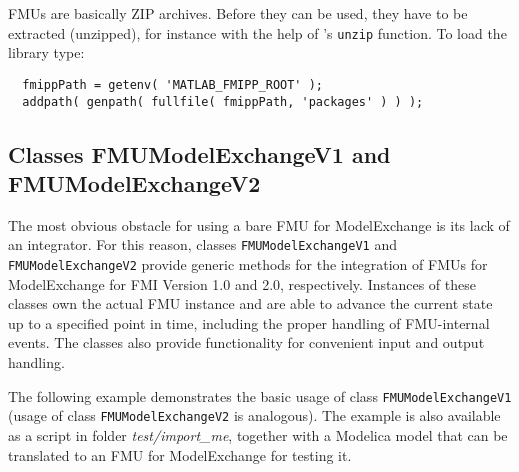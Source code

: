 FMUs are basically ZIP archives.
Before they can be used, they have to be extracted (unzipped), for instance with the help of \matlab's \texttt{unzip} function.
To load the library type:

\begin{verbatim}
  fmippPath = getenv( 'MATLAB_FMIPP_ROOT' );
  addpath( genpath( fullfile( fmippPath, 'packages' ) ) );
\end{verbatim}

\subsection{Classes FMUModelExchangeV1 and FMUModelExchangeV2}

The most obvious obstacle for using a bare FMU for ModelExchange is its lack of an integrator.
For this reason, classes \texttt{FMUModelExchangeV1} and \texttt{FMUModelExchangeV2} provide generic methods for the integration of FMUs for ModelExchange for FMI Version 1.0 and 2.0, respectively.
Instances of these classes own the actual FMU instance and are able to advance the current state up to a specified point in time, including the proper handling of FMU-internal events.
The classes also provide functionality for convenient input and output handling.

The following example demonstrates the basic usage of class \texttt{FMUModelExchangeV1} (usage of class \texttt{FMUModelExchangeV2} is analogous).
The example is also available as a \matlab script in folder \emph{test/import\_me}, together with a Modelica model that can be translated to an FMU for ModelExchange for testing it.

